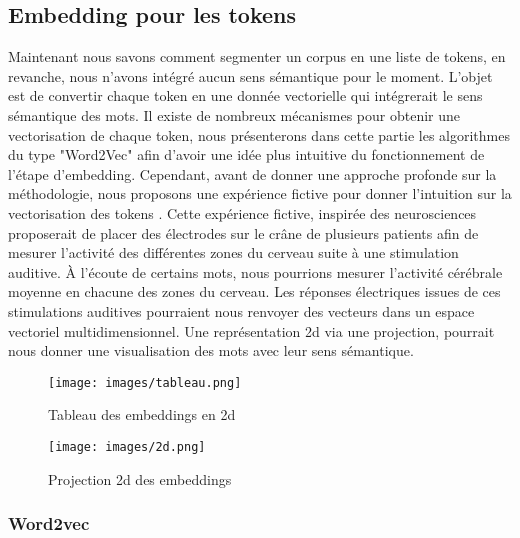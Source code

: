 \documentclass[12pt]{article}
\theoremstyle{definition}
\begin{document}
	
	\subsection{Embedding pour les tokens}

	Maintenant nous savons comment segmenter un corpus en une liste de tokens, en revanche, nous n'avons intégré aucun sens sémantique pour le moment. L'objet est de convertir chaque token en une donnée vectorielle qui intégrerait le sens sémantique des mots. Il existe de nombreux mécanismes pour obtenir une vectorisation de chaque token, nous présenterons dans cette partie les algorithmes du type "Word2Vec" afin d'avoir une idée plus intuitive du fonctionnement de l'étape d'embedding. Cependant, avant de donner une approche profonde sur la méthodologie, nous proposons une expérience fictive pour donner l'intuition sur la vectorisation des tokens \cite{video_embedding}. Cette expérience fictive, inspirée des neurosciences proposerait de placer des électrodes sur le crâne de plusieurs patients afin de mesurer l’activité des différentes zones du cerveau suite à une stimulation auditive. À l’écoute de certains mots, nous pourrions mesurer l’activité cérébrale moyenne en chacune des zones du cerveau. Les réponses électriques issues de ces stimulations auditives pourraient nous renvoyer des vecteurs dans un espace vectoriel multidimensionnel. Une représentation 2d via une projection, pourrait nous donner une visualisation des mots avec leur sens sémantique. \\[1cm] 
	

\begin{figure}[!h]  %
	\centering
	\begin{minipage}[t]{0.45\textwidth}
		\centering
		\texttt{[image: images/tableau.png]}
		\caption{Tableau des embeddings en 2d}
	\end{minipage}\hfill
	\begin{minipage}[t]{0.45\textwidth}
		\centering
		\texttt{[image: images/2d.png]}
		\caption{Projection 2d des embeddings}
	\end{minipage}
\end{figure}







	\subsubsection{Word2vec}
	
\end{document}

